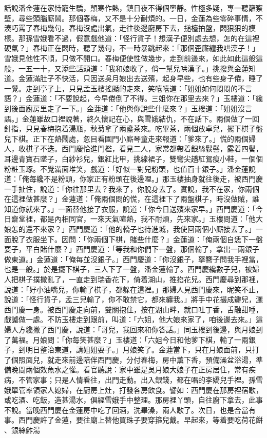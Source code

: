 \begin{showcontents}{}
話說潘金蓮在家恃寵生驕，顛寒作熱，鎮日夜不得個寧靜。性極多疑，專一聽籬察壁，尋些頭腦廝鬧。那個春梅，又不是十分耐煩的。一日，金蓮為些零碎事情，不湊巧罵了春梅幾句。春梅沒處出氣，走往後邊廚房下去，搥檯拍盤，悶狠狠的模樣。那孫雪娥看不過，假意戲他道：「怪行貨子！想漢子便別處去想，怎的在這裡硬氣？」春梅正在悶時，聽了幾句，不一時暴跳起來：「那個歪廝纏我哄漢子！」雪娥見他性不順，只做不開口。春梅便使性做幾步，走到前邊來，如此如此這般這般，一五一十，又添些話頭道：「我和娘收了，俏一幫兒哄漢子。」挑撥與金蓮知道。金蓮滿肚子不快活，只因送吳月娘出去送殯，起身早些，也有些身子倦，睡了一覺。走到亭子上，只見孟玉樓搖颳的走來，笑嘻嘻道：「姐姐如何悶悶的不言語？」金蓮道：「不要說起，今早倦倒了不得。三姐你在那里去來？」玉樓道：「纔到後面廚房里走了一下。」金蓮道：「他與你說些什麼來？」玉樓道：「姐姐沒言語。」金蓮雖故口裡說著，終久懷記在心，與雪娥結仇，不在話下。兩個做了一回針指，只見春梅抱着湯瓶，秋菊拿了兩盞茶來。吃畢茶，兩個放卓兒，擺下棋子盤兒下棋。正下在熱鬧處，忽目看園門小廝琴童走來報道：「爹來了。」慌的兩個婦人，收棋子不迭。西門慶恰進門檻，看見二人，家常都帶着銀絲䯼髻，露着四鬢，耳邊青寶石墜子，白紗衫兒，銀紅比甲，挑線裙子，雙彎尖趫紅鴛瘦小鞋，一個個粉粧玉琢。不覺滿面堆笑，戲道：「好似一對兒粉頭，也值百十銀子。」潘金蓮說道：「俺每纔不是粉頭，你家正有粉頭在後邊哩。」那玉樓抽身就往後走，被西門慶一手扯住，說道：「你往那里去？我來了，你脫身去了。實說，我不在家，你兩個在這裡做甚麼？」金蓮道：「俺兩個悶的慌，在這裡下了兩盤棋子，時沒做賊，誰知道你就來了。」一面替他接了衣服，說道：「你今日送殯來家早。」西門慶道：「今日齋堂裡，都是內相同官，一來天氣喧熱，我不耐煩，先來家。」玉樓問道：「他大娘怎的還不來家？」西門慶道：「他的轎子也待進城，我使回兩個小廝接去了。」一面脫了衣服坐下。因問：「你兩個下棋，賭些什麼？」金蓮道：「俺兩個自恁下一盤耍子，平白賭什麼？」西門慶道：「等我和你們下一盤，那個輸了，拿出一兩銀子做東道。」金蓮道：「俺每並沒銀子。」西門慶道：「你沒銀子，拏簪子問我手裡當，也是一般。」於是擺下棋子，三人下了一盤，潘金蓮輸了。西門慶纔數子兒，被婦人把棋子撲撒亂了，一直走到瑞香花下，倚着湖山，推掐花兒。西門慶尋到那裡，說道：「好小油嘴兒，你輸了棋子，都躲在這裡。」那婦人見西門慶來，眤笑不止，說道：「怪行貨子，孟三兒輸了，你不敢禁它，都來纏我。」將手中花撮成瓣兒，灑西門慶一身。被西門慶走向前，雙關抱住，按在湖山畔，就口吐丁香，舌融甜唾，戲謔做一處。不防玉樓走到跟前，叫道：「六姐，他大娘來家了，咱後邊去來。」這婦人方纔撇了西門慶，說道：「哥兒，我回來和你答話。」同玉樓到後邊，與月娘到了萬福。月娘問：「你每笑甚麼？」玉樓道：「六姐今日和他爹下棋，輸了一兩銀子，到明日整治東道，請姐姐耍子。」月娘笑了。金蓮當下，只在月娘面前，只打了個照面兒，就走來前邊陪伴西門慶，分付春梅，房中薰下香，預備澡盆浴湯，準備晚間兩個效魚水之懽。看官聽說：家中雖是吳月娘大娘子在正房居住，常有疾病，不管家事；只是人情看往，出門走動。出入銀錢，都在唱的李嬌兒手裡。孫雪娥單管率領家人媳婦，在廚房上灶，打發各房飲食。譬如：西門慶在那房裡宿歇，或吃酒、吃飯，造甚湯水，俱經雪娥手中整理。那房裡丫頭，自往廚下拿去，此事不說。當晚西門慶在金蓮房中吃了回酒，洗畢澡，兩人歇了。次日，也是合當有事。西門慶許了金蓮，要往廟上替他買珠子要穿箍兒戴。早起來，等着要吃荷花餅 、銀絲鮓湯 
\end{showcontents}
